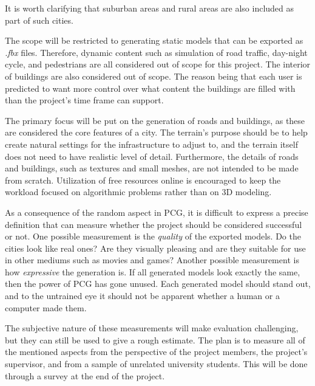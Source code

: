 It is worth clarifying that suburban areas and rural areas are also included as
part of such cities.

The scope will be restricted to generating static models that can be exported as \textit{.fbx} files.
Therefore, dynamic content such as simulation of road traffic, day-night cycle, and pedestrians are all considered out of scope for this project.
The interior of buildings are also considered out of scope.
The reason being that each user is predicted to want more control over what content the buildings are filled with than the project's time frame can support.

The primary focus will be put on the generation of roads and buildings, as these are considered the core features of a city.
The terrain's purpose should be to help create natural settings for the infrastructure to adjust to, and the terrain itself does not need to have realistic level of detail.
Furthermore, the details of roads and buildings, such as textures and small meshes, are not intended to be made from scratch.
Utilization of free resources online is encouraged to keep the workload focused on algorithmic problems rather than on 3D modeling.

As a consequence of the random aspect in PCG, it is difficult to express a precise definition that can measure whether the project should be considered successful or not.
One possible measurement is the \textit{quality} of the exported models.
Do the cities look like real ones?
Are they visually pleasing and are they suitable for use in other mediums such as movies and games?
Another possible measurement is how \textit{expressive} the generation is.
If all generated models look exactly the same, then the power of PCG has gone unused.
Each generated model should stand out, and to the untrained eye it should not be apparent whether a human or a computer made them.

The subjective nature of these measurements will make evaluation challenging, but they can still be used to give a rough estimate.
The plan is to measure all of the mentioned aspects from the perspective of the project members, the project's supervisor, and from a sample of unrelated university students.
This will be done through a survey at the end of the project.

